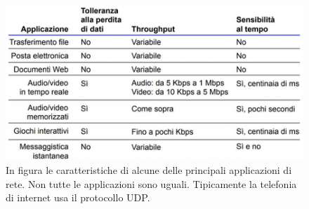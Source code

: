 \documentclass[11pt,a4paper]{article}
\theoremstyle{definition}
\begin{document}
\begin{figure}[!h]
	\includegraphics[scale=0.5]{Immagini/Tcp_udp.png}
	\centering
	\caption{In figura le caratteristiche di alcune delle principali applicazioni di rete. Non tutte le applicazioni sono uguali. Tipicamente la telefonia di internet usa il protocollo UDP.}
\end{figure}
\end{document}
